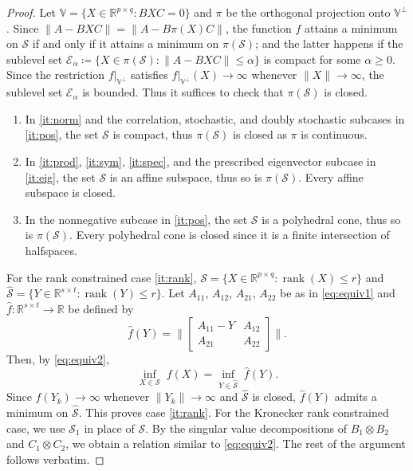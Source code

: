 \documentclass[11pt,reqno]{amsart}
\DeclareMathOperator{\rank}{rank}
\theoremstyle{definition}
\numberwithin{equation}{section}
\newcommand{\R}{\mathbb{R}}
\begin{document}
\begin{proof} 
Let $\mathbb{V} = \{X \in \R^{p \times q} : BXC = 0\}$ and $\pi$ be the orthogonal projection onto $\mathbb{V}^\perp$. Since $\lVert A - BXC \rVert = \lVert A - B\pi(X)C \rVert$, the function $f$ attains a minimum on $\mathcal{S}$ if and only if it attains a minimum on $\pi(\mathcal{S})$; and the latter happens if the sublevel set $\mathcal{E}_\alpha \coloneqq \{X \in \pi(\mathcal{S}) : \lVert A - BXC \rVert \le \alpha\}$ is compact for some $\alpha \ge 0$. Since the restriction $f\bigr\rvert_{\mathbb{V}^\perp}$ satisfies $f\bigr\rvert_{\mathbb{V}^\perp}(X) \to \infty$ whenever $\lVert X \rVert \to \infty$, the sublevel set $\mathcal{E}_\alpha$ is bounded. Thus it suffices to check that $\pi(\mathcal{S})$ is closed.
\begin{enumerate}[\normalfont(i)]
\item In \ref{it:norm} and the correlation, stochastic, and doubly stochastic subcases in \ref{it:pos}, the set $\mathcal{S}$ is compact, thus $\pi(\mathcal{S})$ is closed as $\pi$ is continuous. 
\item In \ref{it:prod}, \ref{it:sym}, \ref{it:spec}, and the prescribed eigenvector subcase in \ref{it:eig}, the set $\mathcal{S}$ is an affine subspace, thus so is $\pi(\mathcal{S})$. Every affine subspace is closed.
\item In the nonnegative subcase in \ref{it:pos}, the set $\mathcal{S}$ is a polyhedral cone, thus so is $\pi(\mathcal{S})$. Every polyhedral cone is closed since it is a finite intersection of halfspaces.
\end{enumerate}
For the rank constrained case \ref{it:rank}, $\mathcal{S} = \{X \in \R^{p \times q} : \rank(X) \le r\}$ and $\widehat{\mathcal{S}} = \{Y \in \R^{s \times t} : \rank(Y) \le r\}$. Let  $A_{11}$, $A_{12}$, $A_{21}$, $A_{22}$ be as in \eqref{eq:equiv1} and $\widehat{f} : \R^{s \times t} \to \R$ be defined by
\[
\widehat{f}(Y) = \biggl \lVert \begin{bmatrix}
    A_{11}-Y &A_{12}\\
A_{21} & A_{22}
\end{bmatrix} \biggr\rVert.
\]
Then, by \eqref{eq:equiv2}, 
\[
    \inf_{X \in \mathcal{S}} \; f(X) = \inf_{Y \in \widehat{\mathcal{S}}} \; \widehat{f}(Y).
\]
Since $\widehat{f}(Y_k) \to \infty$ whenever $\lVert Y_k \rVert \to \infty$ and $\widehat{\mathcal{S}}$ is closed, $\widehat{f}(Y)$ admits a minimum on $\widehat{\mathcal{S}}$. This proves case \ref{it:rank}. For the Kronecker rank constrained case, we use $\mathcal{S}_1$ in place of $\mathcal{S}$. By the singular value decompositions of $B_1 \otimes B_2$ and $C_1 \otimes C_2$, we obtain a relation similar to \eqref{eq:equiv2}. The rest of the argument follows verbatim.


\end{proof}
\end{document}
